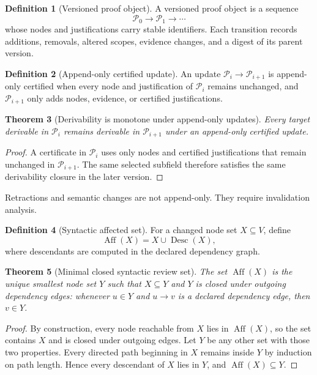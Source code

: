 \documentclass[11pt,oneside]{article}
\newtheorem{theorem}{Theorem}[section]
\theoremstyle{definition}
\newtheorem{definition}[theorem]{Definition}
\theoremstyle{remark}
\newcommand{\Pcal}{\mathcal P}
\newcommand{\Desc}{\operatorname{Desc}}
\begin{document}
\begin{definition}[Versioned proof object]
A versioned proof object is a sequence
\[
\Pcal_0\longrightarrow\Pcal_1\longrightarrow\cdots
\]
whose nodes and justifications carry stable identifiers. Each transition records additions, removals, altered scopes, evidence changes, and a digest of its parent version.
\end{definition}

\begin{definition}[Append-only certified update]
An update $\Pcal_i\to\Pcal_{i+1}$ is append-only certified when every node and justification of $\Pcal_i$ remains unchanged, and $\Pcal_{i+1}$ only adds nodes, evidence, or certified justifications.
\end{definition}

\begin{theorem}[Derivability is monotone under append-only updates]
Every target derivable in $\Pcal_i$ remains derivable in $\Pcal_{i+1}$ under an append-only certified update.
\end{theorem}

\begin{proof}
A certificate in $\Pcal_i$ uses only nodes and certified justifications that remain unchanged in $\Pcal_{i+1}$. The same selected subfield therefore satisfies the same derivability closure in the later version.
\end{proof}

Retractions and semantic changes are not append-only. They require invalidation analysis.

\begin{definition}[Syntactic affected set]
For a changed node set $X\subseteq V$, define
\[
\operatorname{Aff}(X)=X\cup\Desc(X),
\]
where descendants are computed in the declared dependency graph.
\end{definition}

\begin{theorem}[Minimal closed syntactic review set]
The set $\operatorname{Aff}(X)$ is the unique smallest node set $Y$ such that $X\subseteq Y$ and $Y$ is closed under outgoing dependency edges: whenever $u\in Y$ and $u\to v$ is a declared dependency edge, then $v\in Y$.
\end{theorem}

\begin{proof}
By construction, every node reachable from $X$ lies in $\operatorname{Aff}(X)$, so the set contains $X$ and is closed under outgoing edges. Let $Y$ be any other set with those two properties. Every directed path beginning in $X$ remains inside $Y$ by induction on path length. Hence every descendant of $X$ lies in $Y$, and $\operatorname{Aff}(X)\subseteq Y$.
\end{proof}
\end{document}
